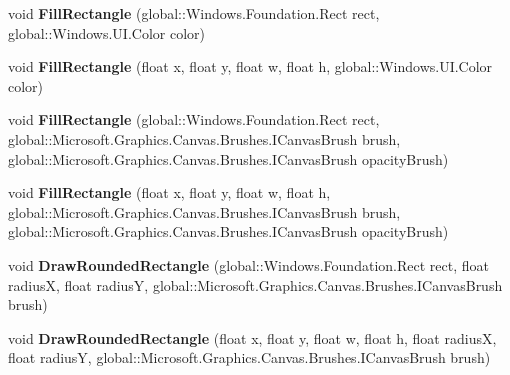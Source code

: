 \begin{DoxyCompactItemize}
void {\bfseries Fill\+Rectangle} (global\+::\+Windows.\+Foundation.\+Rect rect, global\+::\+Windows.\+U\+I.\+Color color)
\item 
\mbox{\label{interface_microsoft_1_1_graphics_1_1_canvas_1_1_i_canvas_drawing_session_a48d32f42bda232e54791b004f6a8f5bd}} 
void {\bfseries Fill\+Rectangle} (float x, float y, float w, float h, global\+::\+Windows.\+U\+I.\+Color color)
\item 
\mbox{\label{interface_microsoft_1_1_graphics_1_1_canvas_1_1_i_canvas_drawing_session_a519f2365cff391980d84e50b7fd2f444}} 
void {\bfseries Fill\+Rectangle} (global\+::\+Windows.\+Foundation.\+Rect rect, global\+::\+Microsoft.\+Graphics.\+Canvas.\+Brushes.\+I\+Canvas\+Brush brush, global\+::\+Microsoft.\+Graphics.\+Canvas.\+Brushes.\+I\+Canvas\+Brush opacity\+Brush)
\item 
\mbox{\label{interface_microsoft_1_1_graphics_1_1_canvas_1_1_i_canvas_drawing_session_abb7c5787d15df087bbf5ae6bb24d087b}} 
void {\bfseries Fill\+Rectangle} (float x, float y, float w, float h, global\+::\+Microsoft.\+Graphics.\+Canvas.\+Brushes.\+I\+Canvas\+Brush brush, global\+::\+Microsoft.\+Graphics.\+Canvas.\+Brushes.\+I\+Canvas\+Brush opacity\+Brush)
\item 
\mbox{\label{interface_microsoft_1_1_graphics_1_1_canvas_1_1_i_canvas_drawing_session_a9d0d5982cb35d8ea63a4e8c9878c2fc4}} 
void {\bfseries Draw\+Rounded\+Rectangle} (global\+::\+Windows.\+Foundation.\+Rect rect, float radiusX, float radiusY, global\+::\+Microsoft.\+Graphics.\+Canvas.\+Brushes.\+I\+Canvas\+Brush brush)
\item 
\mbox{\label{interface_microsoft_1_1_graphics_1_1_canvas_1_1_i_canvas_drawing_session_a70be22ced94e9f343568d5bb37eb2867}} 
void {\bfseries Draw\+Rounded\+Rectangle} (float x, float y, float w, float h, float radiusX, float radiusY, global\+::\+Microsoft.\+Graphics.\+Canvas.\+Brushes.\+I\+Canvas\+Brush brush)
\item 
\mbox{\label{interface_microsoft_1_1_graphics_1_1_canvas_1_1_i_canvas_drawing_session_a51d1664608a745f34514157c95465798}} 

\end{DoxyCompactItemize}
